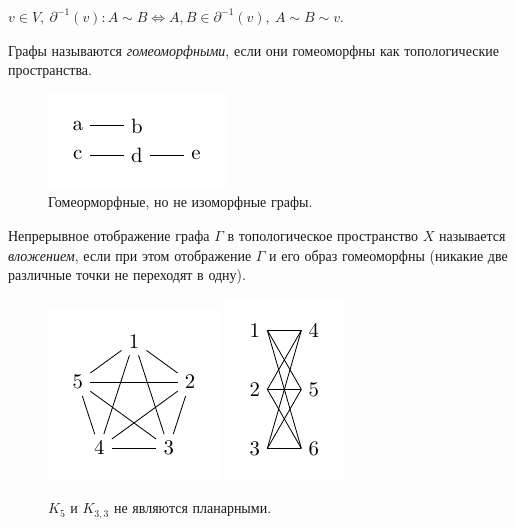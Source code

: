 $v \in V, \ \partial^{-1}(v): A \sim B \Leftrightarrow A, B \in \partial^{-1}(v), \ A \sim B \sim v$.

\begin{definition}
    Графы называются \textit{гомеоморфными}, если они гомеоморфны как топологические пространства.
\end{definition}

\begin{figure}[h]
    \centering
    \includegraphics[scale=2]{images/c3.3.pdf}
    \caption{Гомеорморфные, но не изоморфные графы.}
    \label{fig:c3.3}
\end{figure}

\begin{definition}
    Непрерывное отображение графа $\Gamma$ в топологическое пространство $X$ называется \textit{вложением}, если при этом отображение $\Gamma$ и его образ гомеоморфны (никакие две различные точки не переходят в одну).
\end{definition}

\begin{figure}[h]
    \centering
    \includegraphics[scale=2]{images/c3.4.1.pdf}
    \includegraphics[scale=2]{images/c3.4.2.pdf}
    \caption{$K_5$ и $K_{3,3}$ не являются планарными.}
    \label{fig:c3.4.1,2}
\end{figure}

